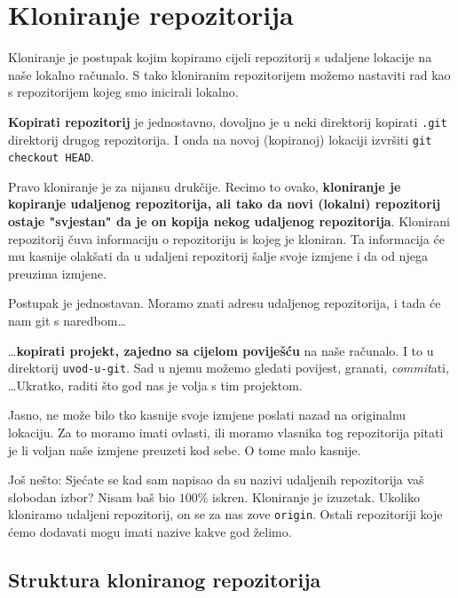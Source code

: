 \section*{Kloniranje repozitorija}

Kloniranje je postupak kojim kopiramo cijeli repozitorij s udaljene lokacije na naše lokalno računalo.
S tako kloniranim repozitorijem možemo nastaviti rad kao s repozitorijem kojeg smo inicirali lokalno.

\textbf{Kopirati repozitorij} je jednostavno, dovoljno je u neki direktorij kopirati \verb+.git+ direktorij drugog repozitorija.
I onda na novoj (kopiranoj) lokaciji izvršiti \verb+git checkout HEAD+.

Pravo kloniranje je za nijansu drukčije.
Recimo to ovako, \textbf{kloniranje je kopiranje udaljenog repozitorija, ali tako da novi (lokalni) repozitorij ostaje "svjestan" da je on kopija nekog udaljenog repozitorija}.
Klonirani repozitorij čuva informaciju o repozitoriju is kojeg je kloniran.
Ta informacija će mu kasnije olakšati da u udaljeni repozitorij šalje svoje izmjene i da od njega preuzima izmjene.

Postupak je jednostavan. Moramo znati adresu udaljenog repozitorija, i tada će nam git s naredbom\dots



\dots{}\textbf{kopirati projekt, zajedno sa cijelom poviješću} na naše računalo.
I to u direktorij \verb+uvod-u-git+.
Sad u njemu možemo gledati povijest, granati, \emph{commit}ati, \dots Ukratko, raditi što god nas je volja s tim projektom.

Jasno, ne može bilo tko kasnije svoje izmjene poslati nazad na originalnu lokaciju. 
Za to moramo imati ovlasti, ili moramo vlasnika tog repozitorija pitati je li voljan naše izmjene preuzeti kod sebe.
O tome malo kasnije.

Još nešto: Sjećate se kad sam napisao da su nazivi udaljenih repozitorija vaš slobodan izbor?
Nisam baš bio $100\%$ iskren. 
Kloniranje je izuzetak.
Ukoliko kloniramo udaljeni repozitorij, on se za nas zove \verb+origin+.
Ostali repozitoriji koje ćemo dodavati mogu imati nazive kakve god želimo.

\subsection*{Struktura kloniranog repozitorija}

